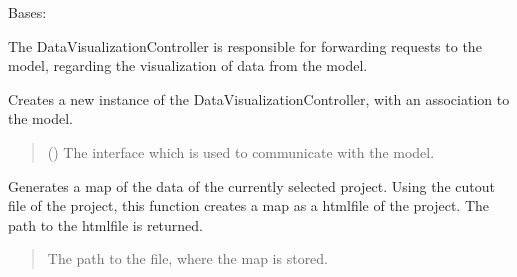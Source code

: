 \documentclass[letterpaper,10pt,english]{sphinxmanual}
\begin{document}
\begin{fulllineitems}
\label{\detokenize{apidoc/src.osm_configurator.control:src.osm_configurator.control.data_visualization_controller.DataVisualizationController}}
\pysigstartsignatures
{}
\pysigstopsignatures
\sphinxAtStartPar
Bases: 

\sphinxAtStartPar
The DataVisualizationController is responsible for forwarding requests to the model,
regarding the visualization of data from the model.

\begin{fulllineitems}
\label{\detokenize{apidoc/src.osm_configurator.control:src.osm_configurator.control.data_visualization_controller.DataVisualizationController.__init__}}
\pysigstartsignatures
{}
\pysigstopsignatures
\sphinxAtStartPar
Creates a new instance of the DataVisualizationController, with an association to the model.
\begin{quote}\begin{description}
\sphinxAtStartPar
{} ({\hyperref[\detokenize{apidoc/src.osm_configurator.model.application:src.osm_configurator.model.application.application_interface.IApplication}]{}}) \textendash{} The interface which is used to communicate with the model.

\end{description}\end{quote}

\end{fulllineitems}


\begin{fulllineitems}
\label{\detokenize{apidoc/src.osm_configurator.control:src.osm_configurator.control.data_visualization_controller.DataVisualizationController.generate_cut_out_map}}
\pysigstartsignatures
{}
\pysigstopsignatures
\sphinxAtStartPar
Generates a map of the data of the currently selected project.
Using the cut\sphinxhyphen{}out file of the project, this function creates a map as a html\sphinxhyphen{}file of the project. The path to the html\sphinxhyphen{}file is returned.
\begin{quote}\begin{description}
\sphinxAtStartPar
The path to the file, where the map is stored.


\end{description}
\end{quote}
\end{fulllineitems}
\end{fulllineitems}
\end{document}
